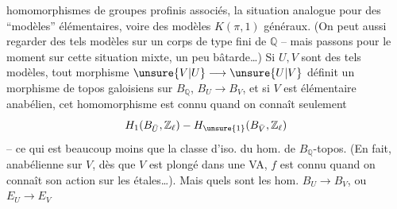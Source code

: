 homomorphismes de groupes profinis associés,   la situation analogue pour des ``modèles'' élémentaires, voire des modèles $K(\pi,1)$ généraux. (On peut aussi regarder des tels modèles sur un corps   de type fini de $\mathbb{Q}$ -- mais passons pour le moment sur cette situation mixte, un peu bâtarde\ldots) Si $U,V$ sont des tels modèles, tout morphisme $\unsure{V|U}\longrightarrow\unsure{U|V}$ définit un morphisme de topos galoisiens sur $B_{\mathbb{Q}}$, $B_U\longrightarrow B_V$,  et si $V$ est  élémentaire anabélien, cet homomorphisme est connu quand on connaît seulement
\[
H_1(B_{\bar U},\mathbb{Z}_{\ell})-H_{\unsure{1}}(B_{\bar V},\mathbb{Z}_{\ell})
\]
-- ce qui est beaucoup moins que la classe d'iso. du hom. de $B_{\mathbb{Q}}$-topos. (En fait,   anabélienne sur $V$, dès que $V$ est plongé dans une VA, $f$ est connu quand on connaît son action sur les  étales\ldots). Mais quels sont les hom. $B_U\longrightarrow B_V$, ou $E_U\longrightarrow E_V$
